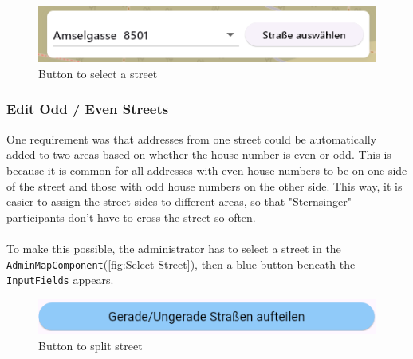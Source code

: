 \begin{figure}[H]
    \centering
    \includegraphics[width=0.6\linewidth]{images/AdminPanel/SelectStreetButton.png}
    \caption{Button to select a street}
\end{figure}


\subsubsection{Edit Odd / Even Streets}
One requirement was that addresses from one street could be automatically added to two areas based on whether the house number is even or odd. This is because it is common for all addresses with even house numbers to be on one side of the street and those with odd house numbers on the other side. This way, it is easier to assign the street sides to different areas, so that "Sternsinger" participants don't have to cross the street so often.\\\\
To make this possible, the administrator has to select a street in the \texttt{AdminMapComponent}(\ref{fig:Select Street}), then a blue button beneath the \texttt{InputFields} appears. \\

\begin{figure}[H]
    \centering
    \includegraphics[width=0.7\linewidth]{images/AdminPanel/splitStreetButton.png}
    \caption{Button to split street}
\end{figure}

